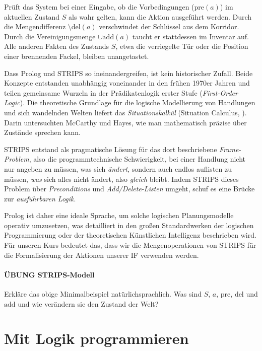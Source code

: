 \documentclass[parskip=half,a4paper,11pt]{scrreprt}
\begin{document}
Prüft das System bei einer Eingabe, ob die Vorbedingungen ($\text{pre}(a)$) im aktuellen Zustand $S$ als wahr gelten, kann die Aktion ausgeführt werden. Durch die Mengendifferenz $\setminus \text{del}(a)$ verschwindet der Schlüssel aus dem Korridor. Durch die Vereinigungsmenge $\cup \text{add}(a)$ taucht er stattdessen im Inventar auf. Alle anderen Fakten des Zustands $S$, etwa die verriegelte Tür oder die Position einer brennenden Fackel, bleiben unangetastet.

Dass Prolog und STRIPS so ineinandergreifen, ist kein historischer Zufall. Beide Konzepte entstanden unabhängig voneinander in den frühen 1970er Jahren und teilen gemeinsame Wurzeln in der Prädikatenlogik erster Stufe (\textit{First-Order Logic}). Die theoretische Grundlage für die logische Modellierung von Handlungen und sich wandelnden Welten liefert das \textit{Situationskalkül} (Situation Calculus, \citealp{McCarthy1969}). Darin untersuchten McCarthy und Hayes, wie man mathematisch präzise über Zustände sprechen kann. 

STRIPS entstand als pragmatische Lösung für das dort beschriebene \textit{Frame-Problem}, also die programmtechnische Schwierigkeit, bei einer Handlung nicht nur angeben zu müssen, was sich \textit{ändert}, sondern auch endlos auflisten zu müssen, \textit{was} sich alles nicht ändert, also \textit{gleich} bleibt. Indem STRIPS dieses Problem über \textit{Preconditions} und \textit{Add/Delete-Listen} umgeht, schuf es eine Brücke zur \textit{ausführbaren Logik}. 

Prolog ist daher eine ideale Sprache, um solche logischen Planungsmodelle operativ umzusetzen, was detailliert in den großen Standardwerken der logischen Programmierung \citep{Bratko2001} oder der theoretischen Künstlichen Intelligenz \citep{Russell2020} beschrieben wird. Für unseren Kurs bedeutet das, dass wir die Mengenoperationen von STRIPS für die Formalisierung der Aktionen unserer IF verwenden werden.

\subsubsection{ÜBUNG STRIPS-Modell}

Erkläre das obige Minimalbeispiel natürlichsprachlich. Was sind $S$, $a$, $\text{pre}$, $\text{del}$ und $\text{add}$ und wie verändern sie den Zustand der Welt?

\chapter{Mit Logik programmieren} 
\end{document}
